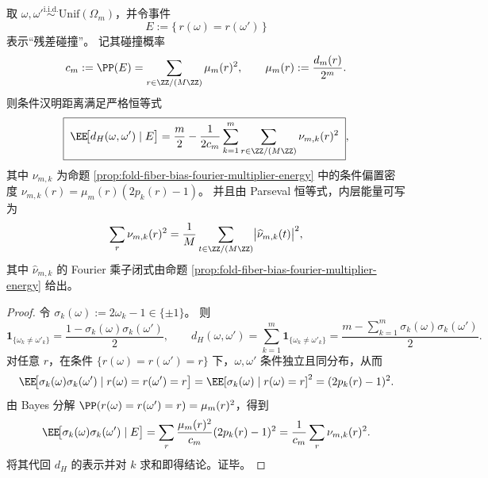 \begin{theorem}[同残差碰撞对的汉明相似度与条件偏置能量恒等式]\label{thm:fold-fiber-collision-hamming-similarity-bias-energy-identity}
取 \(\omega,\omega'\overset{\mathrm{i.i.d.}}{\sim}\mathrm{Unif}(\Omega_m)\)，并令事件
\[
E:=\{\,r(\omega)=r(\omega')\,\}
\]
表示“残差碰撞”。
记其碰撞概率
\[
c_m:=\PP(E)=\sum_{r\in\ZZ/(M\ZZ)}\mu_m(r)^2,
\qquad \mu_m(r):=\frac{d_m(r)}{2^m}.
\]
则条件汉明距离满足严格恒等式
\[
\boxed{\;
\EE\!\bigl[d_H(\omega,\omega')\mid E\bigr]
=\frac{m}{2}-\frac{1}{2c_m}\sum_{k=1}^m\sum_{r\in\ZZ/(M\ZZ)}\nu_{m,k}(r)^2\; } ,
\]
其中 \(\nu_{m,k}\) 为命题 \ref{prop:fold-fiber-bias-fourier-multiplier-energy} 中的条件偏置密度
\(
\nu_{m,k}(r)=\mu_m(r)(2p_k(r)-1)
\)。
并且由 Parseval 恒等式，内层能量可写为
\[
\sum_{r}\nu_{m,k}(r)^2=\frac1M\sum_{t\in\ZZ/(M\ZZ)}\bigl|\widehat{\nu}_{m,k}(t)\bigr|^2,
\]
其中 \(\widehat{\nu}_{m,k}\) 的 Fourier 乘子闭式由命题 \ref{prop:fold-fiber-bias-fourier-multiplier-energy} 给出。
\end{theorem}
\begin{proof}
令 \(\sigma_k(\omega):=2\omega_k-1\in\{\pm1\}\)。
则
\[
\mathbf 1_{\{\omega_k\neq \omega'_k\}}=\frac{1-\sigma_k(\omega)\sigma_k(\omega')}{2},
\qquad
d_H(\omega,\omega')=\sum_{k=1}^m \mathbf 1_{\{\omega_k\neq \omega'_k\}}
=\frac{m-\sum_{k=1}^m \sigma_k(\omega)\sigma_k(\omega')}{2}.
\]
对任意 \(r\)，在条件 \(\{r(\omega)=r(\omega')=r\}\) 下，\(\omega,\omega'\) 条件独立且同分布，从而
\[
\EE\!\bigl[\sigma_k(\omega)\sigma_k(\omega')\mid r(\omega)=r(\omega')=r\bigr]
=\EE[\sigma_k(\omega)\mid r(\omega)=r]^2
=(2p_k(r)-1)^2.
\]
由 Bayes 分解
\(
\PP(r(\omega)=r(\omega')=r)=\mu_m(r)^2
\)，得到
\[
\EE\!\bigl[\sigma_k(\omega)\sigma_k(\omega')\mid E\bigr]
=\sum_{r}\frac{\mu_m(r)^2}{c_m}(2p_k(r)-1)^2
=\frac{1}{c_m}\sum_r \nu_{m,k}(r)^2.
\]
将其代回 \(d_H\) 的表示并对 \(k\) 求和即得结论。证毕。
\end{proof}

